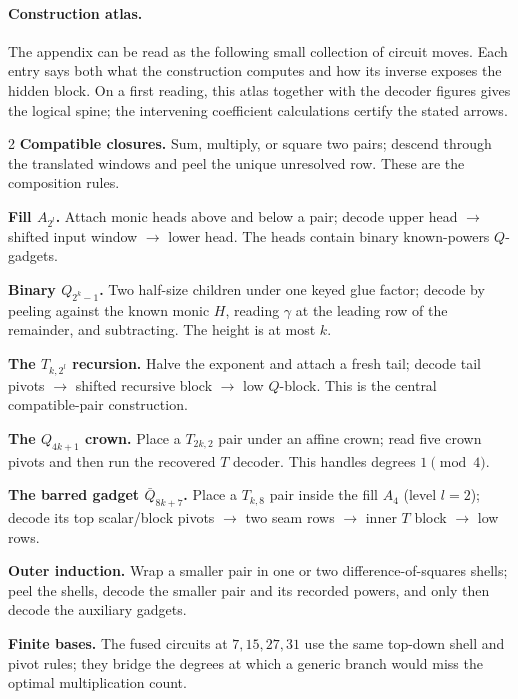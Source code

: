 \paragraph{Construction atlas.}
The appendix can be read as the following small collection of circuit moves.
Each entry says both what the construction computes and how its inverse exposes
the hidden block.  On a first reading, this atlas together with the decoder
figures gives the logical spine; the intervening coefficient calculations
certify the stated arrows.
\begin{multicols}{2}
\small
\raggedcolumns
\noindent\textbf{Compatible closures.}
Sum, multiply, or square two pairs; descend through the translated windows
and peel the unique unresolved row.  These are the composition rules.

\smallskip\noindent\textbf{Fill $A_{2^l}$.}
Attach monic heads above and below a pair; decode upper head
$\to$ shifted input window $\to$ lower head.  The heads contain
binary known-powers $Q$-gadgets.

\smallskip\noindent\textbf{Binary $Q_{2^k-1}$.}
Two half-size children under one keyed glue factor; decode by peeling
against the known monic $H$, reading $\gamma$ at the leading row of the
remainder, and subtracting.  The height is at most $k$.

\smallskip\noindent\textbf{The $T_{k,2^l}$ recursion.}
Halve the exponent and attach a fresh tail; decode tail pivots
$\to$ shifted recursive block $\to$ low $Q$-block.  This is the central
compatible-pair construction.

\smallskip\noindent\textbf{The $Q_{4k+1}$ crown.}
Place a $T_{2k,2}$ pair under an affine crown; read five crown pivots and
then run the recovered $T$ decoder.  This handles degrees $1\pmod4$.

\smallskip\noindent\textbf{The barred gadget $\bar Q_{8k+7}$.}
Place a $T_{k,8}$ pair inside the fill $A_4$ (level $l=2$); decode its top scalar/block
pivots $\to$ two seam rows $\to$ inner $T$ block $\to$ low rows.

\smallskip\noindent\textbf{Outer induction.}
Wrap a smaller pair in one or two difference-of-squares shells; peel the
shells, decode the smaller pair and its recorded powers, and only then decode
the auxiliary gadgets.

\smallskip\noindent\textbf{Finite bases.}
The fused circuits at $7,15,27,31$ use the same top-down shell and pivot
rules; they bridge the degrees at which a generic branch would miss the
optimal multiplication count.
\end{multicols}

